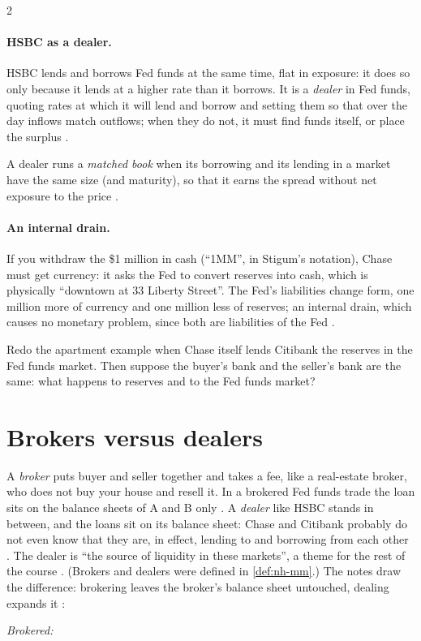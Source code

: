\begin{paracol}{2}
\paragraph{HSBC as a dealer.} HSBC lends and borrows Fed funds at the same time, flat in exposure: it does so only because it lends at a higher rate than it
borrows. It is a \emph{dealer} in Fed funds, quoting rates at which it will lend and borrow and setting them so that over the day inflows match outflows; when
they do not, it must find funds itself, or place the surplus .

\begin{definition}
A dealer runs a \emph{matched book} when its borrowing and its lending in a market have the same size (and maturity), so that it earns the spread without
net exposure to the price .
\end{definition}

\paragraph{An internal drain.} If you withdraw the \$1 million in cash (``1MM'', in Stigum's notation), Chase must get currency: it asks the Fed to convert
reserves into cash, which is physically ``downtown at 33 Liberty Street''. The Fed's liabilities change form, one million more of currency and one million less
of reserves; an internal drain, which causes no monetary problem, since both are liabilities of the Fed .

\begin{exercise}
Redo the apartment example when Chase itself lends Citibank the reserves in the Fed funds market. Then suppose the buyer's bank and the seller's bank are the same:
what happens to reserves and to the Fed funds market?
\end{exercise}

\section{Brokers versus dealers}\label{sec:ff-brokers}

A \emph{broker} puts buyer and seller together and takes a fee, like a real-estate broker, who does not buy your house and resell it. In a brokered Fed funds
trade the loan sits on the balance sheets of A and B only . A \emph{dealer} like HSBC stands in between, and the loans sit on
its balance sheet: Chase and Citibank probably do not even know that they are, in effect, lending to and borrowing from each other . The
dealer is ``the source of liquidity in these markets'', a theme for the rest of the course . (Brokers and dealers were defined in
\cref{def:nh-mm}.) The notes draw the difference: brokering leaves the broker's balance sheet untouched, dealing expands it :
\begin{taccts}
\textit{Brokered:}\quad
{}\quad
{}\quad
{}


\end{taccts}
\end{paracol}
